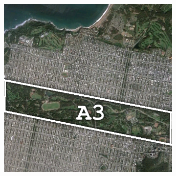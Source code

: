 \begin{figure}[tbp]
\begin{subfigure}[t]{0.19\textwidth}
\caption{}
\label{fig:cla2_c}
\end{subfigure}
\begin{subfigure}[t]{0.19\textwidth}
\includegraphics[width=\columnwidth]{Figures/ALOS2_SF_3Class/SunsetIm} 
\vspace{0.2cm}

\end{subfigure}
\end{figure}

